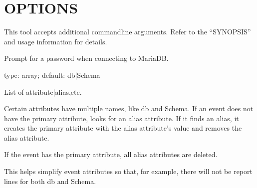 \documentclass[letterpaper,10pt,english]{sphinxmanual}
\begin{document}
\section{OPTIONS}
\label{\detokenize{mariadb-query-digest:options}}
\sphinxAtStartPar
This tool accepts additional command\sphinxhyphen{}line arguments.  Refer to the
“SYNOPSIS” and usage information for details.

\begin{fulllineitems}
\label{\detokenize{mariadb-query-digest:cmdoption-mariadb-query-digest-ask-pass}}
\sphinxAtStartPar
Prompt for a password when connecting to MariaDB.

\end{fulllineitems}


\begin{fulllineitems}
\label{\detokenize{mariadb-query-digest:cmdoption-mariadb-query-digest-attribute-aliases}}
\sphinxAtStartPar
type: array; default: db|Schema

\sphinxAtStartPar
List of attribute|alias,etc.

\sphinxAtStartPar
Certain attributes have multiple names, like db and Schema.  If an event does
not have the primary attribute,  looks for an alias attribute.
If it finds an alias, it creates the primary attribute with the alias
attribute’s value and removes the alias attribute.

\sphinxAtStartPar
If the event has the primary attribute, all alias attributes are deleted.

\sphinxAtStartPar
This helps simplify event attributes so that, for example, there will not
be report lines for both db and Schema.

\end{fulllineitems}
\end{document}
